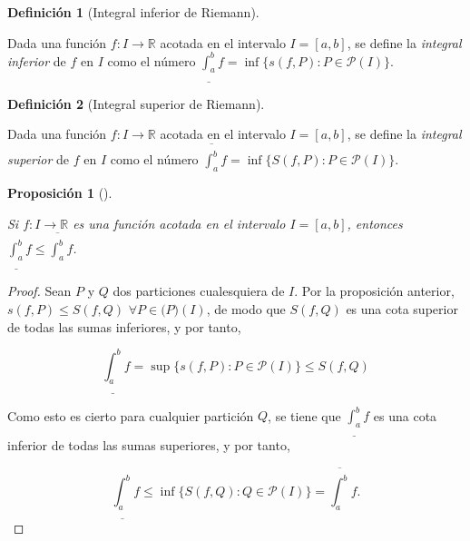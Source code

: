 \documentclass[
  a4paper,
]{scrreport}
\theoremstyle{plain}
\theoremstyle{plain}
\theoremstyle{definition}
\newtheorem{definition}{Definición}[chapter]
\theoremstyle{plain}
\newtheorem{proposition}{Proposición}[chapter]
\theoremstyle{definition}
\theoremstyle{remark}
\begin{document}
\leavevmode{}%
\begin{definition}[Integral inferior de
Riemann]\label{def-integral-inferior-riemann}

Dada una función \(f:I\to\mathbb{R}\) acotada en el intervalo
\(I=[a,b]\), se define la \emph{integral inferior} de \(f\) en \(I\)
como el número
\(\underline{\int_a^b} f =\inf\{s(f,P): P\in \mathcal{P}(I)\}\).

\end{definition}

\leavevmode{}%
\begin{definition}[Integral superior de
Riemann]\label{def-integral-superior-riemann}

Dada una función \(f:I\to\mathbb{R}\) acotada en el intervalo
\(I=[a,b]\), se define la \emph{integral superior} de \(f\) en \(I\)
como el número
\(\overline{\int_a^b} f =\inf\{S(f,P): P\in \mathcal{P}(I)\}\).

\end{definition}

\leavevmode{}%
\begin{proposition}[]\label{prp-integral-riemann-inferior-superior}

Si \(f:I\to\mathbb{R}\) es una función acotada en el intervalo
\(I=[a,b]\), entonces
\(\underline{\int_a^b} f\leq \overline{\int_a^b}f\).

\end{proposition}

\begin{tcolorbox}[enhanced jigsaw, title=\textcolor{quarto-callout-note-color}{\faInfo}\hspace{0.5em}{Demostración}, opacityback=0, titlerule=0mm, colback=white, opacitybacktitle=0.6, colbacktitle=quarto-callout-note-color!10!white, breakable, left=2mm, bottomtitle=1mm, toptitle=1mm, coltitle=black, arc=.35mm, leftrule=.75mm, toprule=.15mm, rightrule=.15mm, bottomrule=.15mm, colframe=quarto-callout-note-color-frame]

\begin{proof}

Sean \(P\) y \(Q\) dos particiones cualesquiera de \(I\). Por la
proposición anterior, \(s(f,P)\leq S(f,Q)\)
\(\forall P\in\mathcal(P)(I)\), de modo que \(S(f,Q)\) es una cota
superior de todas las sumas inferiores, y por tanto,

\[
\underline{\int_a^b} f =  \sup\{s(f,P): P\in\mathcal{P}(I)\}\leq S(f,Q)
\]

Como esto es cierto para cualquier partición \(Q\), se tiene que
\(\underline{\int_a^b} f\) es una cota inferior de todas las sumas
superiores, y por tanto,

\[
\underline{\int_a^b} f \leq \inf\{S(f,Q): Q\in\mathcal{P}(I)\} = \overline{\int_a^b}f.
\]

\end{proof}

\end{tcolorbox}
\end{document}
